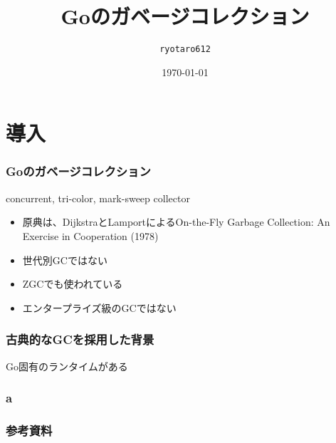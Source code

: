 \documentclass[unicode, 14pt, aspectratio=169]{beamer}
\date{\today}
\title{Goのガベージコレクション}
\author{\texttt{ryotaro612}}
\begin{document}
\begin{frame}
\titlepage
\end{frame}
\section{導入}
\begin{frame}
  \frametitle{Goのガベージコレクション}
  {\large concurrent, tri-color, mark-sweep collector\supercite{go15gc}}
  \begin{itemize}
  \item 原典は、DijkstraとLamportによるOn-the-Fly Garbage Collection: An Exercise in Cooperation (1978)
  \item 世代別GCではない
  \item ZGCでも使われている
  \item エンタープライズ級のGCではない
  \end{itemize}
\end{frame}
\begin{frame}
  \frametitle{古典的なGCを採用した背景}
  {\large Go固有のランタイムがある\supercite{go15gc}}  
\end{frame}
\begin{frame}
  \frametitle{a}
\end{frame}
\begin{frame}[allowframebreaks,t]
  \frametitle{参考資料}
  \printbibliography
  \nocite{*}
\end{frame}
\end{document}
